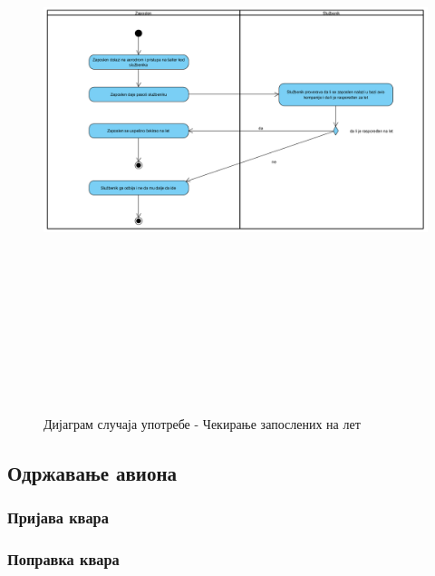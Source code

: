 \documentclass{article}
\begin{document}
\begin{figure}[H]
    \centering
    \includegraphics[width=1.1\textwidth, height=17cm]{Dijagrami_slike/cekiranje_zaposlenih.png}
    \caption{Дијаграм случаја употребе - Чекирање запослених на лет}
\end{figure}

\subsection{Одржавање авиона}

\subsubsection{Пријава квара}

\subsubsection{Поправка квара}
\end{document}
